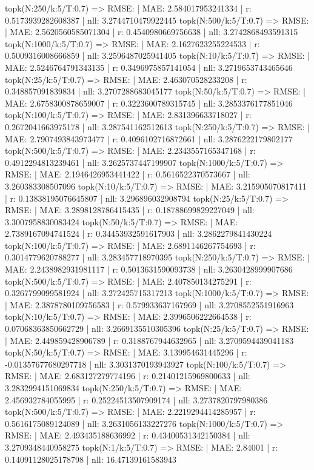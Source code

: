 topk(N:250/k:5/T:0.7) => RMSE: | MAE: 2.584017953241334 | r: 0.5173939282608387 | nll: 3.2744710479922445
topk(N:500/k:5/T:0.7) => RMSE: | MAE: 2.5620560585071304 | r: 0.4540980669756638 | nll: 3.2742868493591315
topk(N:1000/k:5/T:0.7) => RMSE: | MAE: 2.1627623255224533 | r: 0.5009316008666859 | nll: 3.2596487025941405
topk(N:10/k:5/T:0.7) => RMSE: | MAE: 2.5246764791343135 | r: 0.3496975857141054 | nll: 3.2719653743465646
topk(N:25/k:5/T:0.7) => RMSE: | MAE: 2.463070528233208 | r: 0.348857091839834 | nll: 3.2707288683045177
topk(N:50/k:5/T:0.7) => RMSE: | MAE: 2.6758300878659007 | r: 0.3223600789315745 | nll: 3.2853376177851046
topk(N:100/k:5/T:0.7) => RMSE: | MAE: 2.831396633718027 | r: 0.2672041663975178 | nll: 3.287541162512613
topk(N:250/k:5/T:0.7) => RMSE: | MAE: 2.7907493843973477 | r: 0.4096102716872661 | nll: 3.2876222179802177
topk(N:500/k:5/T:0.7) => RMSE: | MAE: 2.2343557165347168 | r: 0.4912294813239461 | nll: 3.2625737447199907
topk(N:1000/k:5/T:0.7) => RMSE: | MAE: 2.1946426953441422 | r: 0.5616522370573667 | nll: 3.260383308507096
topk(N:10/k:5/T:0.7) => RMSE: | MAE: 3.215905070817411 | r: 0.13838195076645807 | nll: 3.296896032908794
topk(N:25/k:5/T:0.7) => RMSE: | MAE: 3.2898128786415435 | r: 0.18788699829227049 | nll: 3.3007958830083424
topk(N:50/k:5/T:0.7) => RMSE: | MAE: 2.7389167094741524 | r: 0.34453932591617903 | nll: 3.2862279841430224
topk(N:100/k:5/T:0.7) => RMSE: | MAE: 2.6891146267754693 | r: 0.3014779620788277 | nll: 3.283457718970395
topk(N:250/k:5/T:0.7) => RMSE: | MAE: 2.2438982931981117 | r: 0.5013631590093738 | nll: 3.2630428999907686
topk(N:500/k:5/T:0.7) => RMSE: | MAE: 2.407850134275291 | r: 0.3267799099581924 | nll: 3.272425715317213
topk(N:1000/k:5/T:0.7) => RMSE: | MAE: 2.3878780109756583 | r: 0.579933637167969 | nll: 3.2708552551916963
topk(N:10/k:5/T:0.7) => RMSE: | MAE: 2.3996506222664538 | r: 0.07068363850662729 | nll: 3.2669135510305396
topk(N:25/k:5/T:0.7) => RMSE: | MAE: 2.449859428906789 | r: 0.3188767944632965 | nll: 3.2709594439041183
topk(N:50/k:5/T:0.7) => RMSE: | MAE: 3.139954631445296 | r: -0.01357677680297718 | nll: 3.3031370193943927
topk(N:100/k:5/T:0.7) => RMSE: | MAE: 2.683127279774196 | r: 0.21401215969800633 | nll: 3.2832994151069834
topk(N:250/k:5/T:0.7) => RMSE: | MAE: 2.456932784055995 | r: 0.25224513507909174 | nll: 3.2737820797980386
topk(N:500/k:5/T:0.7) => RMSE: | MAE: 2.2219294414285957 | r: 0.5616175089124089 | nll: 3.2631056133227276
topk(N:1000/k:5/T:0.7) => RMSE: | MAE: 2.493435188636992 | r: 0.43400531342150384 | nll: 3.2709348440958275
topk(N:1/k:5/T:0.7) => RMSE: | MAE: 2.84001 | r: 0.14091128025178798 | nll: 16.47139161583943
